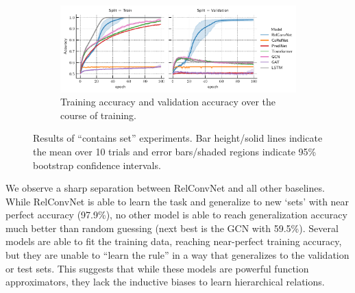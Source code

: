 \begin{figure}[ht]
    \begin{subfigure}[t]{0.97\textwidth}
        \centering
        \includegraphics[width=\textwidth]{figs/experiments/contains_set_training_curves.pdf}
        \caption{Training accuracy and validation accuracy over the course of training.}\label{fig:contains_set_training_curves}
    \end{subfigure}
    \caption{Results of ``contains set'' experiments. Bar height/solid lines indicate the mean over 10 trials and error bars/shaded regions indicate 95\% bootstrap confidence intervals.}\label{fig:contains_set_experiment}
    \vskip-12.5pt
\end{figure}

We observe a sharp separation between RelConvNet and all other baselines. While RelConvNet is able to learn the task and generalize to new `sets' with near perfect accuracy (97.9\%), no other model is able to reach generalization accuracy much better than random guessing (next best is the GCN with 59.5\%). Several models are able to fit the training data, reaching near-perfect training accuracy, but they are unable to ``learn the rule'' in a way that generalizes to the validation or test sets. This suggests that while these models are powerful function approximators, they lack the inductive biases to learn hierarchical relations.

